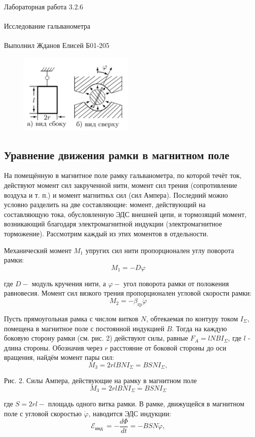 \documentclass{astroedu-lab}
\begin{document}
\begin{problem}{\huge Лабораторная работа 3.2.6\\\\Исследование гальванометра\\\\Выполнил Жданов Елисей Б01-205}
\begin{figure}[!h]
	\centering
	\includegraphics[width=0.5\textwidth]{ramka.png}
	\label{fig:boiler}
\end{figure}

\subsection{Уравнение движения рамки в магнитном поле}

На помещённую в магнитное поле рамку гальванометра, по которой течёт ток, действуют момент сил закрученной нити, момент сил трения (сопротивление воздуха и т. п.) и момент магнитньх сил (сил Ампера). Последний можно условно разделить на две составляющие: момент, действующий на составляющую тока, обусловленную ЭДС внешней цепи, и тормозящий момент, возникающий благодаря электромагнитной индукции (электромагнитное торможение). Рассмотрим каждый из этих моментов в отдельности.

Механический момент $M_1$ упругих сил нити пропорционален углу поворота рамки:
$$
M_1=-D \varphi
$$

где $D-$ модуль кручения нити, а $\varphi-$ угол поворота рамки от положения равновесия.
Момент сил вязкого трения пропорционален угловой скорости рамки:
$$
M_2=-\beta_{\mathrm{rp}} \dot{\varphi}
$$

Пусть прямоугольная рамка с числом витков $N$, обтекаемая по контуру током $I_{\Sigma}$, помещена в магнитное поле с постоянной индукцией $B$. Тогда на каждую боковую сторону рамки (см. рис. 2) действуют силы, равные $F_A=l N B I_{\Sigma}$, где $l$ - длина стороны. Обозначив через $r$ расстояние от боковой стороны до оси вращения, найдём момент пары сил:
$$
M_3=2 r l B N I_{\Sigma}=B S N I_{\Sigma},
$$

Рис. 2. Силы Ампера, действующие на рамку в магнитном поле
$$
M_3=2 r l B N I_{\Sigma}=B S N I_{\Sigma}
$$

где $S=2 r l-$ площадь одного витка рамки.
В рамке, движущейся в магнитном поле с угловой скоростью $\dot{\varphi}$, наводится ЭДС индукции:
$$
\mathcal{E}_{\text {инд }}=-\frac{d \Phi}{d t}=-B S N \dot{\varphi},
$$


\end{problem}
\end{document}
